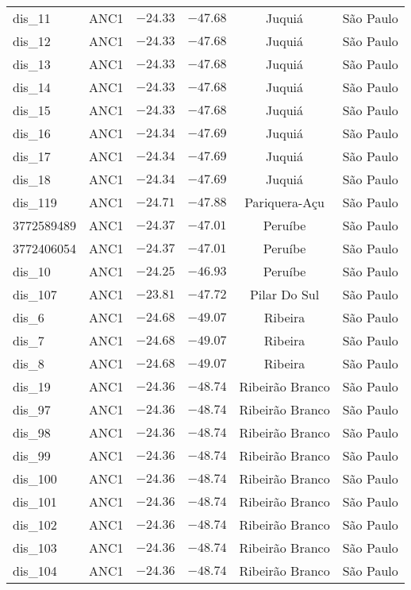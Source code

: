 \begin{longtable}{lccccc}
dis\_11 & ANC1 & $-24.33$ & $-47.68$ & Juquiá & São Paulo \\ 
dis\_12 & ANC1 & $-24.33$ & $-47.68$ & Juquiá & São Paulo \\ 
dis\_13 & ANC1 & $-24.33$ & $-47.68$ & Juquiá & São Paulo \\ 
dis\_14 & ANC1 & $-24.33$ & $-47.68$ & Juquiá & São Paulo \\ 
dis\_15 & ANC1 & $-24.33$ & $-47.68$ & Juquiá & São Paulo \\ 
dis\_16 & ANC1 & $-24.34$ & $-47.69$ & Juquiá & São Paulo \\ 
dis\_17 & ANC1 & $-24.34$ & $-47.69$ & Juquiá & São Paulo \\ 
dis\_18 & ANC1 & $-24.34$ & $-47.69$ & Juquiá & São Paulo \\ 
dis\_119 & ANC1 & $-24.71$ & $-47.88$ & Pariquera-Açu & São Paulo \\ 
3772589489 & ANC1 & $-24.37$ & $-47.01$ & Peruíbe & São Paulo \\ 
3772406054 & ANC1 & $-24.37$ & $-47.01$ & Peruíbe & São Paulo \\ 
dis\_10 & ANC1 & $-24.25$ & $-46.93$ & Peruíbe & São Paulo \\ 
dis\_107 & ANC1 & $-23.81$ & $-47.72$ & Pilar Do Sul & São Paulo \\ 
dis\_6 & ANC1 & $-24.68$ & $-49.07$ & Ribeira & São Paulo \\ 
dis\_7 & ANC1 & $-24.68$ & $-49.07$ & Ribeira & São Paulo \\ 
dis\_8 & ANC1 & $-24.68$ & $-49.07$ & Ribeira & São Paulo \\ 
dis\_19 & ANC1 & $-24.36$ & $-48.74$ & Ribeirão Branco & São Paulo \\ 
dis\_97 & ANC1 & $-24.36$ & $-48.74$ & Ribeirão Branco & São Paulo \\ 
dis\_98 & ANC1 & $-24.36$ & $-48.74$ & Ribeirão Branco & São Paulo \\ 
dis\_99 & ANC1 & $-24.36$ & $-48.74$ & Ribeirão Branco & São Paulo \\ 
dis\_100 & ANC1 & $-24.36$ & $-48.74$ & Ribeirão Branco & São Paulo \\ 
dis\_101 & ANC1 & $-24.36$ & $-48.74$ & Ribeirão Branco & São Paulo \\ 
dis\_102 & ANC1 & $-24.36$ & $-48.74$ & Ribeirão Branco & São Paulo \\ 
dis\_103 & ANC1 & $-24.36$ & $-48.74$ & Ribeirão Branco & São Paulo \\ 
dis\_104 & ANC1 & $-24.36$ & $-48.74$ & Ribeirão Branco & São Paulo \\ 

\end{longtable}
